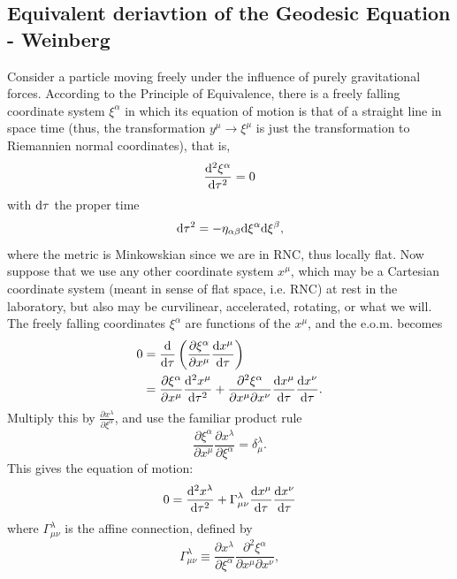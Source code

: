\subsection{Equivalent deriavtion of the Geodesic Equation - Weinberg}
Consider a particle moving freely under the influence of purely gravitational forces. According to the Principle of Equivalence, there is a freely falling coordinate system $\xi^\alpha$ in which its equation of motion is that of a straight line in space time (thus, the transformation $y^\mu \rightarrow \xi^\mu$ is just the transformation to Riemannien normal coordinates), that is,
\begin{equation}
	\frac{\mathrm{d}^2 \xi^\alpha}{\mathrm{d} \tau^2} = 0
\end{equation}
with $\mathrm{d} \tau$ the proper time
\begin{equation}
	\mathrm{d} \tau^2 = - \eta_{\alpha \beta} \mathrm{d} \xi^\alpha \mathrm{d} \xi^\beta,
\end{equation}
where the metric is Minkowskian since we are in RNC, thus locally flat. Now suppose that we use any other coordinate system $x^\mu$, which may be a Cartesian coordinate system (meant in sense of flat space, i.e. RNC) at rest in the laboratory, but also may be curvilinear, accelerated, rotating, or what we will. The freely falling coordinates $\xi^\alpha$ are functions of the $x^\mu$, and the e.o.m. becomes
\begin{align*}
	0&= \frac{\mathrm{d} }{\mathrm{d} \tau} \left(\frac{\partial \xi^\alpha}{\partial x^\mu} \frac{\mathrm{d} x^\mu}{\mathrm{d} \tau}\right)\\
	&= \frac{\partial \xi^\alpha}{\partial x^\mu} \frac{\mathrm{d}^2 x^\mu}{\mathrm{d} \tau^2} + \frac{\partial^2 \xi^\alpha}{\partial x^\mu \partial x^\nu} \frac{\mathrm{d} x^\mu}{\mathrm{d} \tau} \frac{\mathrm{d} x^\nu}{\mathrm{d} \tau}.
\end{align*}
Multiply this by $\frac{\partial x^\lambda}{\partial \xi^\alpha}$, and use the familiar product rule
\begin{equation}
	\frac{\partial \xi^\alpha}{\partial x^\mu} \frac{\partial x^\lambda}{\partial \xi^\alpha} = \delta^\lambda_\mu.
\end{equation}
This gives the equation of motion:
\begin{equation}
	0=\frac{\mathrm{d}^2 x^\lambda}{\mathrm{d} \tau^2} + \Gamma^\lambda_{\mu \nu} \frac{\mathrm{d} x^\mu}{\mathrm{d} \tau} \frac{\mathrm{d} x^\nu}{\mathrm{d} \tau}
\end{equation}
where $\Gamma^\lambda_{\mu \nu}$ is the affine connection, defined by
\begin{equation}
	\Gamma^\lambda_{\mu \nu} \equiv \frac{\partial x^\lambda}{\partial \xi^\alpha} \frac{\partial^2 \xi^\alpha}{\partial x^\mu \partial x^\nu},
\end{equation}
